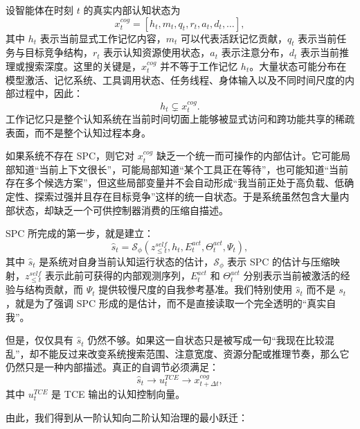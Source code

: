 设智能体在时刻 $t$ 的真实内部认知状态为
\begin{equation}
x_t^{cog}
=
\left[
h_t,
m_t,
q_t,
r_t,
a_t,
d_t,
\ldots
\right],
\label{eq:cognitive-hidden-state}
\end{equation}
其中 $h_t$ 表示当前显式工作记忆内容，$m_t$ 可以代表活跃记忆贡献，$q_t$ 表示当前任务与目标竞争结构，$r_t$ 表示认知资源使用状态，$a_t$ 表示注意分布，$d_t$ 表示当前推理或搜索深度。这里的关键是，$x_t^{cog}$ 并不等于工作记忆 $h_t$。大量状态可能分布在模型激活、记忆系统、工具调用状态、任务线程、身体输入以及不同时间尺度的内部过程中，因此：
\begin{equation}
h_t
\subsetneq
x_t^{cog}.
\end{equation}
工作记忆只是整个认知系统在当前时间切面上能够被显式访问和跨功能共享的稀疏表面，而不是整个认知过程本身。

如果系统不存在 SPC，则它对 $x_t^{cog}$ 缺乏一个统一而可操作的内部估计。它可能局部知道``当前上下文很长''，可能局部知道``某个工具正在等待''，也可能知道``当前存在多个候选方案''，但这些局部变量并不会自动形成``我当前正处于高负载、低确定性、探索过强并且存在目标竞争''这样的统一自状态。于是系统虽然包含大量内部状态，却缺乏一个可供控制器消费的压缩自描述。

SPC 所完成的第一步，就是建立：
\begin{equation}
\hat{s}_t
=
\mathcal{S}_{\phi}
\left(
z_{\leq t}^{self},
h_t,
E_t^{act},
\Theta_t^{act},
\Psi_t
\right),
\label{eq:spc-estimation}
\end{equation}
其中 $\hat{s}_t$ 是系统对自身当前认知运行状态的估计，$\mathcal{S}_{\phi}$ 表示 SPC 的估计与压缩映射，$z_{\leq t}^{self}$ 表示此前可获得的内部观测序列，$E_t^{act}$ 和 $\Theta_t^{act}$ 分别表示当前被激活的经验与结构贡献，而 $\Psi_t$ 提供较慢尺度的自我参考基准。我们特别使用 $\hat{s}_t$ 而不是 $s_t$，就是为了强调 SPC 形成的是估计，而不是直接读取一个完全透明的``真实自我''。

但是，仅仅具有 $\hat{s}_t$ 仍然不够。如果这一自状态只是被写成一句``我现在比较混乱''，却不能反过来改变系统搜索范围、注意宽度、资源分配或推理节奏，那么它仍然只是一种内部描述。真正的自调节必须满足：
\begin{equation}
\hat{s}_t
\longrightarrow
u_t^{TCE}
\longrightarrow
x_{t+\Delta t}^{cog},
\label{eq:self-state-to-control}
\end{equation}
其中 $u_t^{TCE}$ 是 TCE 输出的认知控制向量。

由此，我们得到从一阶认知向二阶认知治理的最小跃迁：
\begin{statementbox}
\centering
{}
\end{statementbox}

